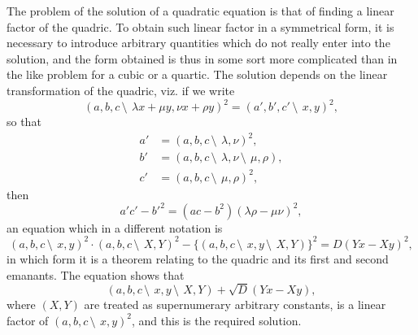 \documentclass[11pt,a4paper]{book}
\begin{document}
\begin{center}
The problem of the solution of a quadratic equation is that of finding a linear factor of the quadric. To obtain such linear factor in a symmetrical form, it is necessary to introduce arbitrary quantities which do not really enter into the solution, and the form obtained is thus in some sort more complicated than in the like problem for a cubic or a quartic. The solution depends on the linear transformation of the quadric, viz. if we write
\[
(a, b, c\,\setminus\!\!\:\, \lambda x + \mu y, \nu x + \rho y)^2 = (a', b', c'\,\setminus\!\!\:\, x, y)^2,
\]
so that
\begin{align*}
a' &= (a, b, c\,\setminus\!\!\:\, \lambda, \nu)^2,\\
b' &= (a, b, c\,\setminus\!\!\:\, \lambda, \nu\,\setminus\!\!\:\, \mu, \rho),\\
c' &= (a, b, c\,\setminus\!\!\:\, \mu, \rho)^2,
\end{align*}
then
\[
a'c' - b'^2 = (ac - b^2)(\lambda\rho - \mu\nu)^2,
\]
an equation which in a different notation is
\[
(a, b, c\,\setminus\!\!\:\, x, y)^2 \cdot (a, b, c\,\setminus\!\!\:\, X, Y)^2 - \{(a, b, c\,\setminus\!\!\:\, x, y\,\setminus\!\!\:\, X, Y)\}^2 = D(Yx - Xy)^2,
\]
in which form it is a theorem relating to the quadric and its first and second emanants. The equation shows that
\[
(a, b, c\,\setminus\!\!\:\, x, y\,\setminus\!\!\:\, X, Y) + \sqrt{D}(Yx - Xy),
\]
where $(X, Y)$ are treated as supernumerary arbitrary constants, is a linear factor of $(a, b, c\,\setminus\!\!\:\, x, y)^2$, and this is the required solution.

\subsection{}


\end{center}
\end{document}
